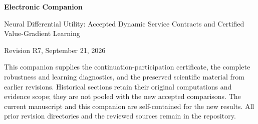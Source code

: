 \documentclass[11pt,letterpaper]{article}
\theoremstyle{definition}
\newcommand{\1}{\mathbf 1}
\begin{document}
\begin{center}{\Large\bfseries Electronic Companion\par}\medskip
{\large Neural Differential Utility: Accepted Dynamic Service Contracts and Certified Value-Gradient Learning\par}\medskip
Revision R7, September 21, 2026
\end{center}
This companion supplies the continuation-participation certificate, the complete robustness and learning diagnostics, and the preserved scientific material from earlier revisions. Historical sections retain their original computations and evidence scope; they are not pooled with the new accepted comparisons. The current manuscript and this companion are self-contained for the new results. All prior revision directories and the reviewed sources remain in the repository.








\clearpage

\clearpage

\end{document}
